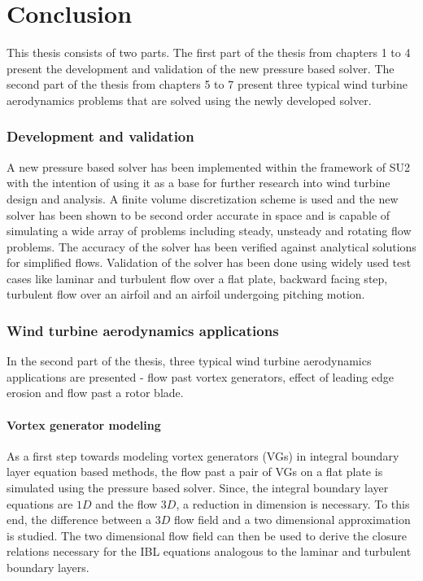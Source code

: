 \chapter*{Conclusion}
This thesis consists of two parts. The first part of the thesis from chapters 1 to 4 present the development and validation of the new pressure based solver. The second part of the thesis from chapters 5 to 7 present three typical wind turbine aerodynamics problems that are solved using the newly developed solver.

\subsection*{Development and validation}
A new pressure based solver has been implemented within the framework of SU2 with the intention of using it as a base for further research into wind turbine design and analysis. A finite volume discretization scheme is used and the new solver has been shown to be second order accurate in space and is capable of simulating a wide array of problems including steady, unsteady and rotating flow problems. The accuracy of the solver has been verified against analytical solutions for simplified flows. Validation of the solver has been done using widely used test cases like laminar and turbulent flow over a flat plate, backward facing step, turbulent flow over an airfoil and an airfoil undergoing pitching motion.

\subsection*{Wind turbine aerodynamics applications}
In the second part of the thesis, three typical wind turbine aerodynamics applications are presented - flow past vortex generators, effect of leading edge erosion and flow past a rotor blade. 

\subsubsection*{Vortex generator modeling}
As a first step towards modeling vortex generators (VGs) in integral boundary layer equation based methods, the flow past a pair of VGs on a flat plate is simulated using the pressure based solver. Since, the integral boundary layer equations are $1D$ and the flow $3D$, a reduction in dimension is necessary. To this end, the difference between a $3D$ flow field and a two dimensional approximation is studied. The two dimensional flow field can then be used to derive the closure relations necessary for the IBL equations analogous to the laminar and turbulent boundary layers.

